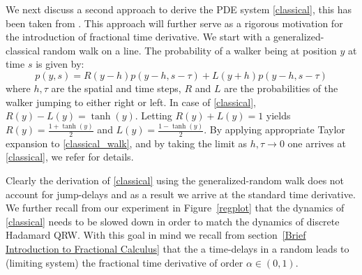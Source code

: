 \documentclass{siamart1116}
\begin{document}
We next discuss a second approach to derive the PDE system \eqref{classical}, this has been
taken from \cite{barkai}. This approach will further serve as a rigorous motivation for the 
introduction of fractional time derivative. We start with a generalized-classical random
walk on a line. The probability of a walker being at position $y$ at time $s$ is given by:
%
\begin{equation}\label{classical_walk}
p(y,s) = R(y-h)p(y-h,s-\tau)+L(y+h)p(y-h,s-\tau)
\end{equation}
%
where $h,\tau$ are the spatial and time steps, $R$ and $L$ are the probabilities of the walker 
jumping to either right or left. In case of \eqref{classical}, $R(y)-L(y)=\tanh(y)$. Letting  
$R(y)+L(y)=1$ yields $R(y) = \frac{1+\tanh(y)}{2}$ and $L(y) = \frac{1-\tanh(y)}{2}$. By applying
appropriate Taylor expansion to \eqref{classical_walk}, and by taking the limit as $h,\tau\to0$ 
one arrives at \eqref{classical}, we refer \cite{barkai} for details. 



Clearly the derivation of \eqref{classical} using the generalized-random walk does not account for
jump-delays and as a result we arrive at the standard time derivative. We further recall from 
our experiment in Figure~\ref{regplot} that the dynamics of \eqref{classical} needs to be slowed
down in order to match the dynamics of discrete Hadamard QRW. With this goal in mind we recall 
from section~\ref{Brief Introduction to Fractional Calculus} that the a time-delays in a random
leads to (limiting system) the fractional time derivative of order $\alpha \in (0,1)$. 
\end{document}
